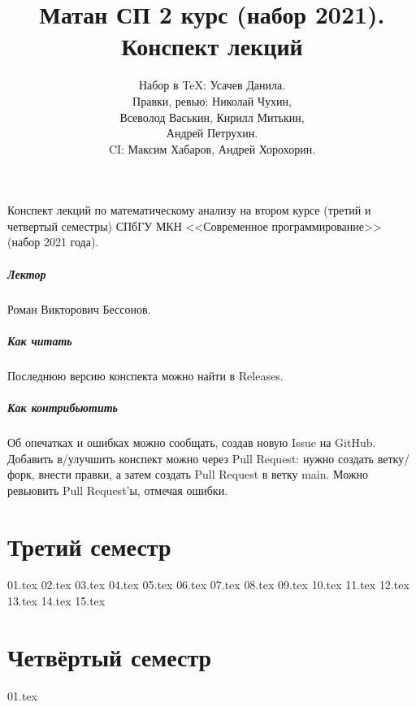 \documentclass[a4paper,14pt]{extarticle}
\title{Матан СП 2 курс (набор 2021). \\ Конспект лекций}
\author{Набор в \TeX: Усачев Данила. \\ Правки, ревью: Николай Чухин, \\ Всеволод Васькин, Кирилл Митькин, \\ Андрей Петрухин. \\ CI: Максим Хабаров, Андрей Хорохорин.}
\theoremstyle{definition}
\theoremstyle{plain}
\theoremstyle{plain}
\theoremstyle{plain}
\theoremstyle{plain}
\theoremstyle{definition}
\theoremstyle{definition}
\theoremstyle{definition}
\theoremstyle{definition}
\theoremstyle{definition}
\theoremstyle{definition}
\theoremstyle{definition}
\theoremstyle{definition}
\theoremstyle{plain}
\theoremstyle{plain}
\theoremstyle{plain}
\theoremstyle{plain}
\theoremstyle{definition}
\theoremstyle{definition}
\theoremstyle{definition}
\theoremstyle{definition}
\theoremstyle{definition}
\theoremstyle{definition}
\begin{document}
\maketitle
Конспект лекций по математическому анализу на втором курсе (третий и четвертый семестры) СПбГУ МКН <<Современное программирование>> (набор 2021 года).
\subsubsection*{Лектор}
Роман Викторович Бессонов.
\subsubsection*{Как читать}
Последнюю версию конспекта можно найти в Releases.
\subsubsection*{Как контрибьютить}
Об опечатках и ошибках можно сообщать, создав новую Issue на GitHub.
Добавить в/улучшить конспект можно через Pull Request: нужно создать ветку/форк, внести правки, а затем создать Pull Request в ветку main.
Можно ревьювить Pull Request'ы, отмечая ошибки.
\newpage
\tableofcontents
\newpage

\part{Третий семестр}

{01.tex}
{02.tex}
{03.tex}
{04.tex}
{05.tex}
{06.tex}
{07.tex}
{08.tex}
{09.tex}
{10.tex}
{11.tex}
{12.tex}
{13.tex}
{14.tex}
{15.tex}

\newpage
\part{Четвёртый семестр}

{01.tex}
\end{document}
